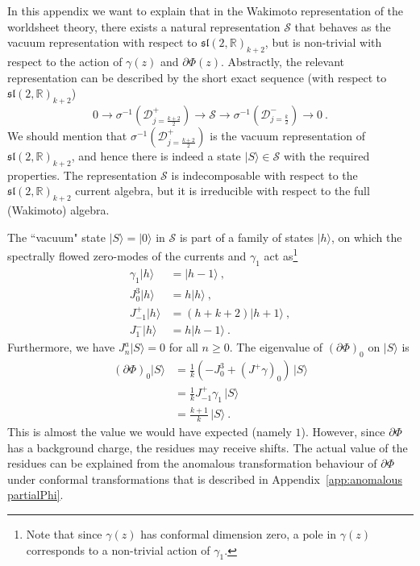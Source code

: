\documentclass[12pt,a4paper]{article}
\newcommand{\be}{\begin{equation}}
\newcommand{\ee}{\end{equation}}
\newcommand{\ket}[1]{| #1\rangle}
\begin{document}
In this appendix we want to explain that in the Wakimoto representation of the worldsheet theory, there exists a natural representation $\mathscr{S}$ that behaves as the vacuum representation with respect to $\mathfrak{sl}(2,\mathds{R})_{k+2}$, but is non-trivial with respect to the action of $\gamma(z)$ and $\partial \Phi(z)$. Abstractly, the relevant representation can be described by the short exact sequence (with respect to $\mathfrak{sl}(2,\mathds{R})_{k+2}$)
\be 
0 \longrightarrow\sigma^{-1}(\mathscr{D}^+_{j=\frac{k+2}{2}})\longrightarrow \mathscr{S} \longrightarrow\sigma^{-1}(\mathscr{D}^-_{j=\frac{k}{2}}) \longrightarrow 0\ .
\ee
We should mention that $\sigma^{-1}(\mathscr{D}^+_{j=\frac{k+2}{2}})$ is the vacuum representation of $\mathfrak{sl}(2,\mathds{R})_{k+2}$, and hence there is indeed a state $\ket{S} \in \mathscr{S}$ with the required properties. 
The representation $\mathscr{S}$ is indecomposable with respect to the $\mathfrak{sl}(2,\mathds{R})_{k+2}$ current algebra, but it is irreducible with respect to the full (Wakimoto) algebra.

The ``vacuum" state $\ket{S}=\ket{0}$ in $\mathscr{S}$ is part of a family of states $\ket{h}$, on which the spectrally flowed zero-modes of the currents and $\gamma_1$ act as\footnote{Note that since $\gamma(z)$ has conformal dimension zero, a pole in $\gamma(z)$ corresponds to a non-trivial action of $\gamma_1$.} 
\begin{subequations}
\begin{align}
\gamma_1 \ket{h}&=\ket{h-1}\ , \\
J^3_0 \ket{h}&=h \ket{h}\ , \\
J_{-1}^+ \ket{h}&=(h+k+2) \ket{h+1}\ , \\
J_1^- \ket{h}&=h \ket{h-1}\ .
\end{align}
\end{subequations}
Furthermore, we have $J^a_n \ket{S} = 0$ for all $n\geq 0$. 
The eigenvalue of $(\partial \Phi)_0$ on $\ket{S}$ is
\begin{align}
(\partial \Phi)_0 \ket{S}&=\frac{1}{k}(-J_0^3+(J^+\gamma)_0)\, \ket{S}\\
&=\frac{1}{k}J^+_{-1}\gamma_1 \, \ket{S} \\
&=\frac{k+1}{k} \, \ket{S}\ .
\end{align}
This is almost the value we would have expected (namely $1$). However, since $\partial \Phi$ has a background charge, the residues may receive shifts. The actual value of the residues can be explained from the anomalous transformation behaviour of $\partial \Phi$ under conformal transformations that is described in Appendix~\ref{app:anomalous partialPhi}.
\end{document}
